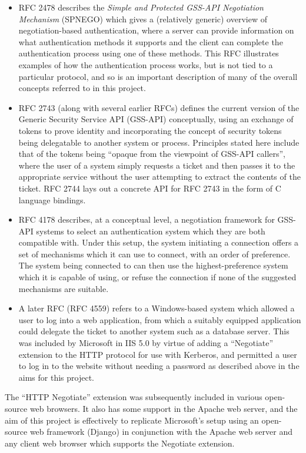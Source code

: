 \documentclass{article}
\begin{document}
\begin{itemize}
\item
  RFC 2478\cite{RFC2478} describes the \textit{Simple and Protected GSS-API Negotiation Mechanism} (SPNEGO) which gives a (relatively generic) overview of negotiation-based authentication, where a server can provide information on what authentication methods it supports and the client can complete the authentication process using one of these methods. This RFC illustrates examples of how the authentication process works, but is not tied to a particular protocol, and so is an important description of many of the overall concepts referred to in this project.
\item
  RFC 2743\cite{RFC2743} (along with several earlier RFCs) defines the current version of the Generic Security Service API (GSS-API) conceptually, using an exchange of tokens to prove identity and incorporating the concept of security tokens being delegatable to another system or process. Principles stated here include that of the tokens being ``opaque from the viewpoint of GSS-API callers'', where the user of a system simply requests a ticket and then passes it to the appropriate service without the user attempting to extract the contents of the ticket. RFC 2744\cite{RFC2744} lays out a concrete API for RFC 2743 in the form of C language bindings.
\item
  RFC 4178\cite{RFC4178} describes, at a conceptual level, a negotiation framework for GSS-API systems to select an authentication system which they are both compatible with. Under this setup, the system initiating a connection offers a set of mechanisms which it can use to connect, with an order of preference. The system being connected to can then use the highest-preference system which it is capable of using, or refuse the connection if none of the suggested mechanisms are suitable.
\item
  A later RFC (RFC 4559\cite{RFC4559}) refers to a Windows-based system which allowed a user to log into a web application, from which a suitably equipped application could delegate the ticket to another system such as a database server. This was included by Microsoft in IIS 5.0 by virtue of adding a ``Negotiate'' extension to the HTTP protocol for use with Kerberos, and permitted a user to log in to the website without needing a password as described above in the aims for this project.
\end{itemize}

The ``HTTP Negotiate'' extension was subsequently included in various open-source web browsers. It also has some support in the Apache web server, and the aim of this project is effectively to replicate Microsoft's setup using an open-source web framework (Django) in conjunction with the Apache web server and any client web browser which supports the Negotiate extension.
\end{document}
